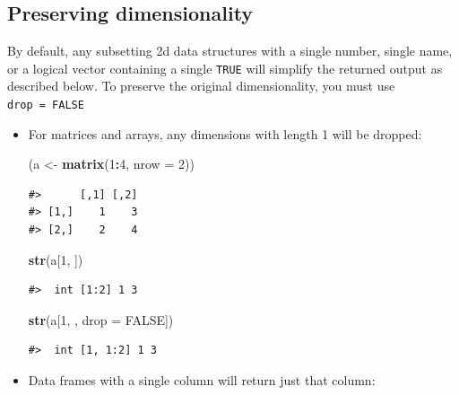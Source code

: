 \documentclass[]{book}
\newenvironment{Shaded}{\begin{snugshade}}{\end{snugshade}}
\newcommand{\KeywordTok}[1]{\textcolor[rgb]{0.13,0.29,0.53}{\textbf{#1}}}
\newcommand{\DataTypeTok}[1]{\textcolor[rgb]{0.13,0.29,0.53}{#1}}
\newcommand{\DecValTok}[1]{\textcolor[rgb]{0.00,0.00,0.81}{#1}}
\newcommand{\StringTok}[1]{\textcolor[rgb]{0.31,0.60,0.02}{#1}}
\newcommand{\OtherTok}[1]{\textcolor[rgb]{0.56,0.35,0.01}{#1}}
\newcommand{\OperatorTok}[1]{\textcolor[rgb]{0.81,0.36,0.00}{\textbf{#1}}}
\newcommand{\NormalTok}[1]{#1}
\theoremstyle{definition}
\theoremstyle{definition}
\theoremstyle{definition}
\theoremstyle{remark}
\begin{document}
\subsection{Preserving dimensionality}\label{preserving-dimensionality}

By default, any subsetting 2d data structures with a single number,
single name, or a logical vector containing a single \texttt{TRUE} will
simplify the returned output as described below. To preserve the
original dimensionality, you must use \texttt{drop\ =\ FALSE}

\begin{itemize}
\item
  For matrices and arrays, any dimensions with length 1 will be dropped:

\begin{Shaded}
\begin{Highlighting}[]
\NormalTok{(a <-}\StringTok{ }\KeywordTok{matrix}\NormalTok{(}\DecValTok{1}\OperatorTok{:}\DecValTok{4}\NormalTok{, }\DataTypeTok{nrow =} \DecValTok{2}\NormalTok{))}
\end{Highlighting}
\end{Shaded}

\begin{verbatim}
#>      [,1] [,2]
#> [1,]    1    3
#> [2,]    2    4
\end{verbatim}

\begin{Shaded}
\begin{Highlighting}[]
\KeywordTok{str}\NormalTok{(a[}\DecValTok{1}\NormalTok{, ])}
\end{Highlighting}
\end{Shaded}

\begin{verbatim}
#>  int [1:2] 1 3
\end{verbatim}

\begin{Shaded}
\begin{Highlighting}[]
\KeywordTok{str}\NormalTok{(a[}\DecValTok{1}\NormalTok{, , }\DataTypeTok{drop =} \OtherTok{FALSE}\NormalTok{])}
\end{Highlighting}
\end{Shaded}

\begin{verbatim}
#>  int [1, 1:2] 1 3
\end{verbatim}
\item
  Data frames with a single column will return just that column:


\end{itemize}
\end{document}
